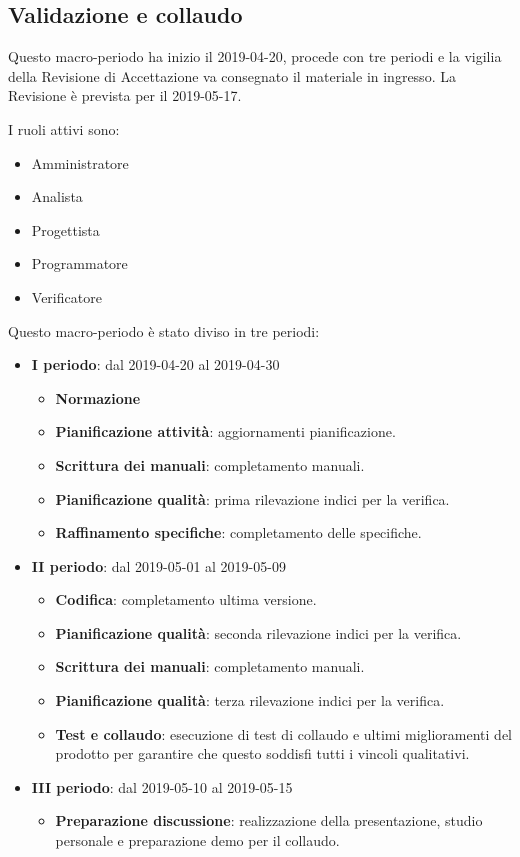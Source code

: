         \subsection{Validazione e collaudo}\label{PianificazineValidazione}
		Questo macro-periodo ha inizio il 2019-04-20, procede con tre periodi e la vigilia della Revisione di Accettazione va consegnato il materiale in
        ingresso. La Revisione è prevista per il 2019-05-17.

        I ruoli attivi sono:
        \begin{itemize}
            \item Amministratore
            \item Analista
            \item Progettista
            \item Programmatore
            \item Verificatore
		\end{itemize}

        Questo macro-periodo è stato diviso in tre periodi:
		\begin{itemize}
			\item \textbf{I periodo}: dal 2019-04-20 al 2019-04-30
			\begin{itemize}
    	        \item \textbf{Normazione}
    	        \item \textbf{Pianificazione attività}: aggiornamenti pianificazione.
                \item \textbf{Scrittura dei manuali}: completamento manuali.
    	        \item \textbf{Pianificazione qualità}:  prima rilevazione indici per la verifica.
    	        \item \textbf{Raffinamento specifiche}: completamento delle specifiche.
        	\end{itemize}
			\item \textbf{II periodo}: dal 2019-05-01 al 2019-05-09
			\begin{itemize}
    	        \item \textbf{Codifica}: completamento ultima versione.
                \item \textbf{Pianificazione qualità}:  seconda rilevazione indici per la verifica.
    	        \item \textbf{Scrittura dei manuali}: completamento manuali.
                \item \textbf{Pianificazione qualità}:  terza rilevazione indici per la verifica.
    	        \item \textbf{Test e collaudo}: esecuzione di test di collaudo e ultimi miglioramenti del prodotto per
    	        garantire che questo soddisfi tutti i vincoli qualitativi.
			\end{itemize}
			\item \textbf{III periodo}: dal 2019-05-10 al 2019-05-15
			\begin{itemize}
				\item \textbf{Preparazione discussione}: realizzazione della presentazione, studio personale e preparazione demo per il collaudo.
			\end{itemize}
		\end{itemize}

